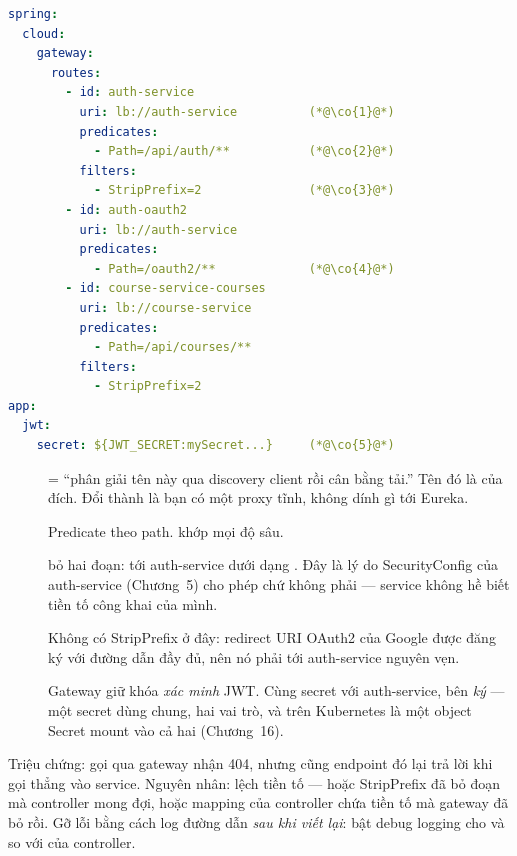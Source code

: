 \begin{lstlisting}[language=yaml]
spring:
  cloud:
    gateway:
      routes:
        - id: auth-service
          uri: lb://auth-service          (*@\co{1}@*)
          predicates:
            - Path=/api/auth/**           (*@\co{2}@*)
          filters:
            - StripPrefix=2               (*@\co{3}@*)
        - id: auth-oauth2
          uri: lb://auth-service
          predicates:
            - Path=/oauth2/**             (*@\co{4}@*)
        - id: course-service-courses
          uri: lb://course-service
          predicates:
            - Path=/api/courses/**
          filters:
            - StripPrefix=2
app:
  jwt:
    secret: ${JWT_SECRET:mySecret...}     (*@\co{5}@*)
\end{lstlisting}

\begin{description}
  \item[]  = ``phân giải tên này qua discovery client
  rồi cân bằng tải.'' Tên đó là  của
  đích. Đổi  thành  là bạn có một proxy tĩnh,
  không dính gì tới Eureka.
  \item[] Predicate theo path. \code{**} khớp mọi độ sâu.
  \item[]  bỏ hai đoạn:
   tới auth-service dưới dạng .
  Đây là lý do SecurityConfig của auth-service (Chương~5) cho phép
   chứ không phải  --- service không
  hề biết tiền tố công khai của mình.
  \item[] Không có StripPrefix ở đây: redirect URI OAuth2 của
  Google được đăng ký với đường dẫn đầy đủ, nên nó phải tới auth-service
  nguyên vẹn.
  \item[] Gateway giữ khóa \emph{xác minh} JWT. Cùng secret với
  auth-service, bên \emph{ký} --- một secret dùng chung, hai vai trò, và
  trên Kubernetes là một object Secret mount vào cả hai
  (Chương~16).
\end{description}

\begin{pitfall}
Triệu chứng: gọi  qua gateway nhận 404, nhưng
cũng endpoint đó lại trả lời khi gọi thẳng vào service. Nguyên nhân:
lệch tiền tố --- hoặc StripPrefix đã bỏ đoạn mà controller mong đợi,
hoặc mapping của controller chứa tiền tố mà gateway đã bỏ rồi. Gỡ lỗi
bằng cách log đường dẫn \emph{sau khi viết lại}: bật debug logging cho
 và so với  của
controller.
\end{pitfall}

